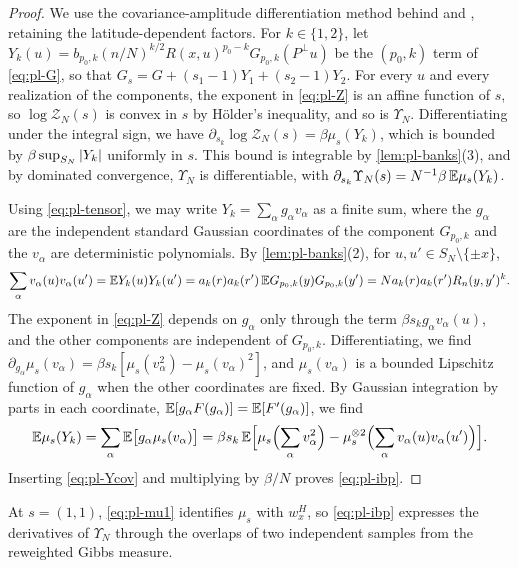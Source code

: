 \begin{proof}
We use the covariance-amplitude differentiation method behind \cite[Theorem~1]{Panchenko2008} and \cite[Proposition~2.2]{AuffingerElAlaouiSellke2025}, retaining the latitude-dependent factors. For $k\in\{1,2\}$, let $Y_k(u)=b_{p_0,k}(n/N)^{k/2}R(x,u)^{p_0-k}G_{p_0,k}(P^\perp u)$ be the $(p_0,k)$ term of \eqref{eq:pl-G}, so that $G_s=G+(s_1-1)Y_1+(s_2-1)Y_2$. For every $u$ and every realization of the components, the exponent in \eqref{eq:pl-Z} is an affine function of $s$, so $\log\mathcal Z_N(s)$ is convex in $s$ by H\"older's inequality, and so is $\Upsilon_N$. Differentiating under the integral sign, we have $\partial_{s_k}\log\mathcal Z_N(s)=\beta\mu_s(Y_k)$, which is bounded by $\beta\sup_{S_N}\left|Y_k\right|$ uniformly in $s$. This bound is integrable by \cref{lem:pl-banks}(3), and by dominated convergence, $\Upsilon_N$ is differentiable, with $\partial_{s_k}\Upsilon_N(s)=N^{-1}\beta\,\mathbb E\mu_s(Y_k)$.

Using \eqref{eq:pl-tensor}, we may write $Y_k=\sum_\alpha g_\alpha v_\alpha$ as a finite sum, where the $g_\alpha$ are the independent standard Gaussian coordinates of the component $G_{p_0,k}$ and the $v_\alpha$ are deterministic polynomials. By \cref{lem:pl-banks}(2), for $u,u'\in S_N\setminus\{\pm x\}$,
\begin{equation}\label{eq:pl-Ycov}
\sum_\alpha v_\alpha(u)v_\alpha(u')=\mathbb E Y_k(u)Y_k(u')=a_k(r)a_k(r')\,\mathbb E G_{p_0,k}(y)G_{p_0,k}(y')=Na_k(r)a_k(r')R_n(y,y')^k .
\end{equation}
The exponent in \eqref{eq:pl-Z} depends on $g_\alpha$ only through the term $\beta s_kg_\alpha v_\alpha(u)$, and the other components are independent of $G_{p_0,k}$. Differentiating, we find $\partial_{g_\alpha}\mu_s(v_\alpha)=\beta s_k[\mu_s(v_\alpha^2)-\mu_s(v_\alpha)^2]$, and $\mu_s(v_\alpha)$ is a bounded Lipschitz function of $g_\alpha$ when the other coordinates are fixed. By Gaussian integration by parts in each coordinate, $\mathbb E[g_\alpha F(g_\alpha)]=\mathbb E[F'(g_\alpha)]$, we find
\[
\mathbb E\mu_s(Y_k)=\sum_\alpha\mathbb E\bigl[g_\alpha\mu_s(v_\alpha)\bigr]
=\beta s_k\,\mathbb E\Bigl[\mu_s\Bigl(\sum_\alpha v_\alpha^2\Bigr)-\mu_s^{\otimes2}\Bigl(\sum_\alpha v_\alpha(u)v_\alpha(u')\Bigr)\Bigr].
\]
Inserting \eqref{eq:pl-Ycov} and multiplying by $\beta/N$ proves \eqref{eq:pl-ibp}.
\end{proof}

At $s=(1,1)$, \eqref{eq:pl-mu1} identifies $\mu_s$ with $w_x^H$, so \eqref{eq:pl-ibp} expresses the derivatives of $\Upsilon_N$ through the overlaps of two independent samples from the reweighted Gibbs measure.

